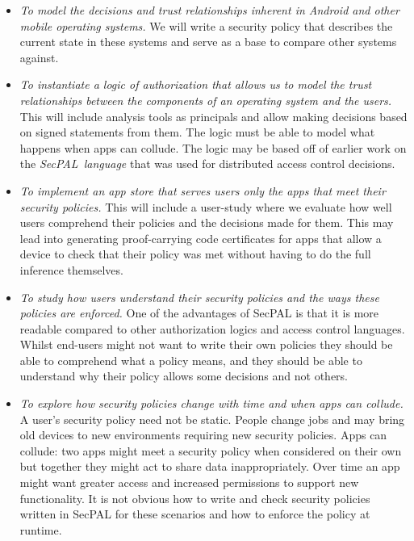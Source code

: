 \documentclass[a4paper,sfsidenotes]{tufte-book}
\begin{document}
\begin{itemize}
  \item \emph{To model the decisions and trust relationships inherent in Android
      and other mobile operating systems.}  We will write a
    security policy that describes the current state in these systems and serve
    as a base to compare other systems against. 

  \item \emph{To instantiate a logic of authorization that allows us to model
      the trust relationships between the components of an operating system and
      the users.}  This will include analysis tools as principals and allow
    making decisions based on signed statements from them.  The logic must be
    able to model what happens when apps can collude.  The logic may be based
    off of earlier work on the \emph{SecPAL~language}\cite{Becker:2006vh} that
    was used for distributed access control decisions.

  \item \emph{To implement an app store that serves users only the apps that
      meet their security policies.}  This will include a user-study where we
    evaluate how well users comprehend their policies and the decisions made for
    them. This may lead into generating proof-carrying code certificates for
    apps that allow a device to check that their policy was met without having
    to do the full inference themselves.

  \item \emph{To study how users understand their security policies and the
      ways these policies are enforced.}  One of the advantages of SecPAL is
    that it is more readable compared to other authorization logics and access
    control languages.  Whilst end-users might not want to write their own
    policies they should be able to comprehend what a policy means, and they
    should be able to understand why their policy allows some decisions and not
    others.

  \item \emph{To explore how security policies change with time and when apps
      can collude.}  A user's security policy need not be static.  People change
    jobs and may bring old devices to new environments requiring new security
    policies.  Apps can collude: two apps might meet a security policy when
    considered on their own but together they might act to share data
    inappropriately.  Over time an app might want greater access and increased
    permissions to support new functionality.  It is not obvious how to write
    and check security policies written in SecPAL for these scenarios and how
    to enforce the policy at runtime.

\end{itemize}
\end{document}
